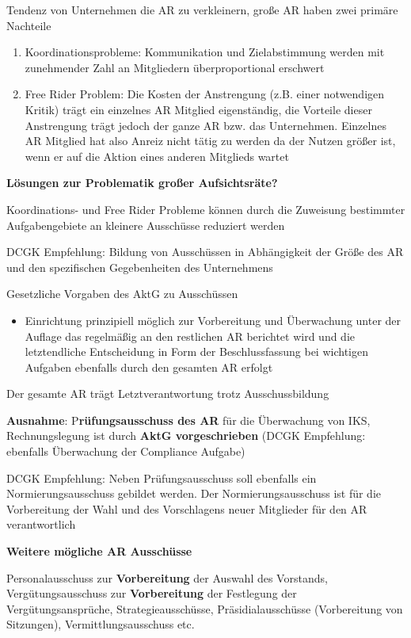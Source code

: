 \documentclass[
]{article}
\providecommand{\tightlist}{%
  \setlength{\itemsep}{0pt}\setlength{\parskip}{0pt}}
\begin{document}
Tendenz von Unternehmen die AR zu verkleinern, große AR haben zwei
primäre Nachteile

\begin{enumerate}
\def\labelenumi{\arabic{enumi}.}
\tightlist
\item
  Koordinationsprobleme: Kommunikation und Zielabstimmung werden mit
  zunehmender Zahl an Mitgliedern überproportional erschwert
\item
  Free Rider Problem: Die Kosten der Anstrengung (z.B. einer notwendigen
  Kritik) trägt ein einzelnes AR Mitglied eigenständig, die Vorteile
  dieser Anstrengung trägt jedoch der ganze AR bzw. das Unternehmen.
  Einzelnes AR Mitglied hat also Anreiz nicht tätig zu werden da der
  Nutzen größer ist, wenn er auf die Aktion eines anderen Mitglieds
  wartet
\end{enumerate}

\textbf{Lösungen zur Problematik großer Aufsichtsräte?}

Koordinations- und Free Rider Probleme können durch die Zuweisung
bestimmter Aufgabengebiete an kleinere Ausschüsse reduziert werden

DCGK Empfehlung: Bildung von Ausschüssen in Abhängigkeit der Größe des
AR und den spezifischen Gegebenheiten des Unternehmens

Gesetzliche Vorgaben des AktG zu Ausschüssen

\begin{itemize}
\tightlist
\item
  Einrichtung prinzipiell möglich zur Vorbereitung und Überwachung unter
  der Auflage das regelmäßig an den restlichen AR berichtet wird und die
  letztendliche Entscheidung in Form der Beschlussfassung bei wichtigen
  Aufgaben ebenfalls durch den gesamten AR erfolgt
\end{itemize}

Der gesamte AR trägt Letztverantwortung trotz Ausschussbildung

\textbf{Ausnahme}: P\textbf{rüfungsausschuss des AR} für die Überwachung
von IKS, Rechnungslegung ist durch \textbf{AktG vorgeschrieben} (DCGK
Empfehlung: ebenfalls Überwachung der Compliance Aufgabe)

DCGK Empfehlung: Neben Prüfungsausschuss soll ebenfalls ein
Normierungsausschuss gebildet werden. Der Normierungsausschuss ist für
die Vorbereitung der Wahl und des Vorschlagens neuer Mitglieder für den
AR verantwortlich

\textbf{Weitere mögliche AR Ausschüsse}

Personalausschuss zur \textbf{Vorbereitung} der Auswahl des Vorstands,
Vergütungsausschuss zur \textbf{Vorbereitung} der Festlegung der
Vergütungsansprüche, Strategieausschüsse, Präsidialausschüsse
(Vorbereitung von Sitzungen), Vermittlungsausschuss etc.
\end{document}
